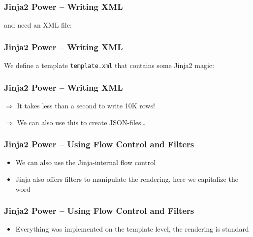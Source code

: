 \documentclass[english]{beamer}
\begin{document}
\begin{frame}[fragile]
\frametitle{Jinja2 Power -- Writing XML}

and need an XML file:\vspace*{1em}



\end{frame}

\begin{frame}[fragile]
\frametitle{Jinja2 Power -- Writing XML}

We define a template \texttt{template.xml} that contains some Jinja2 magic:



\end{frame}

\begin{frame}[fragile]
\frametitle{Jinja2 Power -- Writing XML}



$\Rightarrow$ It takes less than a second to write 10K rows!

$\Rightarrow$ We can also use this to create JSON-files\ldots
\end{frame}

\begin{frame}[fragile]
\frametitle{Jinja2 Power -- Using Flow Control and Filters }

\begin{itemize}
	\item We can also use the Jinja-internal flow control
	\item Jinja also offers filters to manipulate the rendering, here we capitalize the word
\end{itemize}



\end{frame}

\begin{frame}[fragile]
\frametitle{Jinja2 Power -- Using Flow Control and Filters }

\begin{itemize}
	\item Everything was implemented on the template level, the rendering is standard
\end{itemize}



\end{frame}
\end{document}
